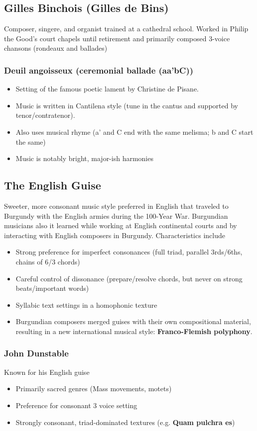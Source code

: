 \documentclass{article}
\begin{document}
  \subsection{Gilles Binchois (Gilles de Bins)}
  Composer, singere, and organist trained at a cathedral school. Worked in Philip the Good's court chapels until retirement and primarily composed 3-voice chansons (rondeaux and ballades)
  \subsubsection{Deuil angoisseux (ceremonial ballade (aa'bC))}
  \begin{itemize}
    \item Setting of the famous poetic lament by Christine de Pisane. 
    \item  Music is written in Cantilena style (tune in the cantus and supported by tenor/contratenor).
    \item Also uses musical rhyme (a' and C end with the same melisma; b and C start the same)
    \item Music is notably bright, major-ish harmonies
  \end{itemize}
  \subsection{The English Guise}
  Sweeter, more consonant music style preferred in English that traveled to Burgundy with the English armies during the 100-Year War. Burgundian musicians also it learned while working at English continental courts and by interacting with English composers in Burgundy. Characteristics include
  \begin{itemize}
    \item Strong preference for imperfect consonances (full triad, parallel 3rds/6ths, chains of 6/3 chords)
    \item Careful control of dissonance (prepare/resolve chords, but never on strong beats/important words)
    \item Syllabic text settings in a homophonic texture
    \item Burgundian composers merged guises with their own compositional material, resulting in a new international musical style: \textbf{Franco-Flemish polyphony}.
  \end{itemize}
  \subsubsection{John Dunstable}
  Known for his English guise
  \begin{itemize}
    \item Primarily sacred genres (Mass movements, motets)
    \item Preference for consonant 3 voice setting 
    \item Strongly consonant, triad-dominated textures (e.g. \textbf{Quam pulchra es})
  \end{itemize}
\end{document}
